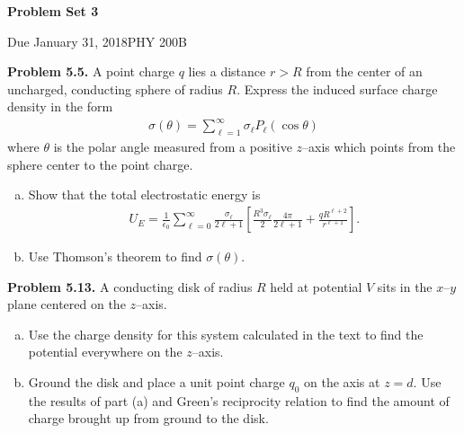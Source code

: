 \documentclass{article}
\newcommand{\Title}     {Problem Set 3}
\newcommand{\DueDate}   {January 31, 2018}
\newcommand{\Course}    {PHY 200B}
\begin{document}
{\huge\bf\Title}

Due \DueDate \hfill \Course


\hrulefill

\textbf{Problem 5.5.} A point charge $q$ lies a distance $r > R$ from the center of an uncharged, conducting sphere of radius $R$. Express the induced surface charge density in the form
\begin{equation*}
\begin{aligned}
    \sigma(\theta) = \sum_{\ell = 1}^\infty \sigma_\ell P_\ell(\cos\theta)
\end{aligned}
\end{equation*}
where $\theta$ is the polar angle measured from a positive $z$--axis which points from the sphere center to the point charge.
\begin{enumerate}[(a)]
    \item Show that the total electrostatic energy is
    \begin{equation*}
    \begin{aligned}
        U_E = \frac{1}{\epsilon_0}\sum_{\ell=0}^\infty \frac{\sigma_\ell}{2\ell + 1}\left[\frac{R^3\sigma_\ell}{2}\frac{4\pi}{2\ell + 1} + \frac{q R^{\ell+2}}{r^{\ell+1}}\right].
    \end{aligned}
    \end{equation*}

    \item Use Thomson's theorem to find $\sigma(\theta)$.
\end{enumerate}


\hrulefill

\textbf{Problem 5.13.} A conducting disk of radius $R$ held at potential $V$ sits in the $x$--$y$ plane centered on the $z$--axis.
\begin{enumerate}[(a)]
    \item Use the charge density for this system calculated in the text to find the potential everywhere on the $z$--axis.
    \item Ground the disk and place a unit point charge $q_0$ on the axis at $z = d$. Use the results of part (a) and Green’s reciprocity relation to find the amount of charge brought up from ground to the disk.
\end{enumerate}
\end{document}
